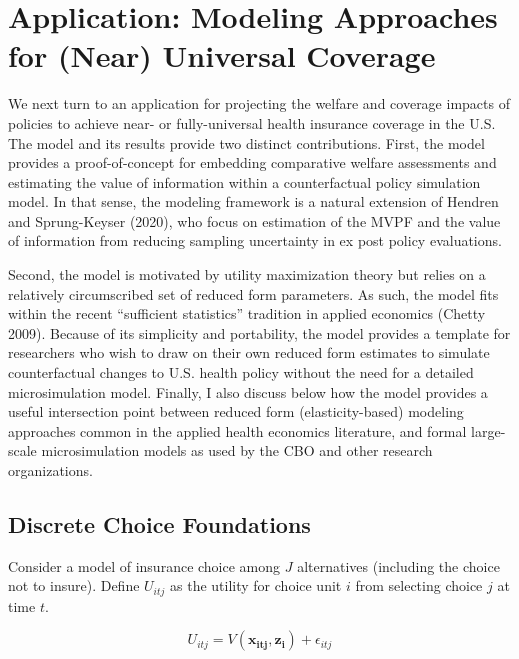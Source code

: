 \documentclass[
  10pt,
]{article}
\begin{document}
\hypertarget{application-modeling-approaches-for-near-universal-coverage}{%
\section{Application: Modeling Approaches for (Near) Universal
Coverage}\label{application-modeling-approaches-for-near-universal-coverage}}

We next turn to an application for projecting the welfare and coverage
impacts of policies to achieve near- or fully-universal health insurance
coverage in the U.S. The model and its results provide two distinct
contributions. First, the model provides a proof-of-concept for
embedding comparative welfare assessments and estimating the value of
information within a counterfactual policy simulation model. In that
sense, the modeling framework is a natural extension of Hendren and
Sprung-Keyser (2020), who focus on estimation of the MVPF and the value
of information from reducing sampling uncertainty in ex post policy
evaluations.

Second, the model is motivated by utility maximization theory but relies
on a relatively circumscribed set of reduced form parameters. As such,
the model fits within the recent ``sufficient statistics'' tradition in
applied economics (Chetty 2009). Because of its simplicity and
portability, the model provides a template for researchers who wish to
draw on their own reduced form estimates to simulate counterfactual
changes to U.S. health policy without the need for a detailed
microsimulation model. Finally, I also discuss below how the model
provides a useful intersection point between reduced form
(elasticity-based) modeling approaches common in the applied health
economics literature, and formal large-scale microsimulation models as
used by the CBO and other research organizations.

\hypertarget{discrete-choice-foundations}{%
\subsection{Discrete Choice
Foundations}\label{discrete-choice-foundations}}

Consider a model of insurance choice among \(J\) alternatives (including
the choice not to insure). Define \(U_{itj}\) as the utility for choice
unit \(i\) from selecting choice \(j\) at time \(t\).

\begin{equation}
\label{eq:utility_1}
U_{itj} = V(\mathbf{x_{itj}}, \mathbf{z_i})+ \epsilon_{itj}
\end{equation}
\end{document}
